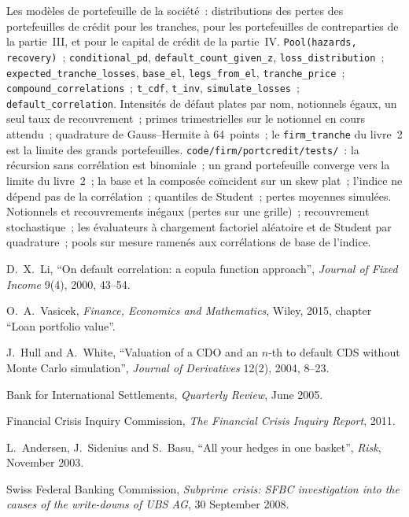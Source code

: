 \begin{build}
 Les modèles de portefeuille de la société~: distributions des pertes des portefeuilles de crédit
pour les tranches, pour les portefeuilles de contreparties de la partie~III, et pour le capital de crédit
de la partie~IV.
 \texttt{Pool(hazards, recovery)}~; \texttt{conditional\_pd},
\texttt{default\_count\_given\_z}, \texttt{loss\_distribution}~; \texttt{expected\_tranche\_losses},
\texttt{base\_el}, \texttt{legs\_from\_el}, \texttt{tranche\_price}~;
\texttt{compound\_correlations}~; \texttt{t\_cdf}, \texttt{t\_inv}, \texttt{simulate\_losses}~;
\texttt{default\_correlation}.
 Intensités de défaut plates par nom, notionnels égaux, un seul taux de recouvrement~; primes
trimestrielles sur le notionnel en cours attendu~; quadrature de Gauss--Hermite à 64~points~; le
\texttt{firm\_tranche} du livre~2 est la limite des grands portefeuilles.
 \texttt{code/firm/portcredit/tests/}~: la récursion sans
corrélation est binomiale~; un grand portefeuille converge vers la limite du livre~2~; la base et la composée
coïncident sur un skew plat~; l'indice ne dépend pas de la corrélation~; quantiles de Student~; pertes moyennes simulées.
 Notionnels et recouvrements inégaux (pertes sur une grille)~; recouvrement
stochastique~; les évaluateurs à chargement factoriel aléatoire et de Student par quadrature~; pools
sur mesure ramenés aux corrélations de base de l'indice.
\end{build}

\begin{omsources}
\item D.\ X.\ Li, ``On default correlation: a copula function approach'', \emph{Journal of
Fixed Income} 9(4), 2000, 43--54.
\item O.\ A.\ Vasicek, \emph{Finance, Economics and Mathematics}, Wiley, 2015, chapter
``Loan portfolio value''.
\item J.\ Hull and A.\ White, ``Valuation of a CDO and an $n$-th to default CDS without
Monte Carlo simulation'', \emph{Journal of Derivatives} 12(2), 2004, 8--23.
\item Bank for International Settlements, \emph{Quarterly Review}, June 2005.
\item Financial Crisis Inquiry Commission, \emph{The Financial Crisis Inquiry Report},
2011.
\item L.\ Andersen, J.\ Sidenius and S.\ Basu, ``All your hedges in one basket'', \emph{Risk},
November 2003.
\item Swiss Federal Banking Commission, \emph{Subprime crisis: SFBC investigation into the causes of the
write-downs of UBS AG}, 30 September 2008.
\end{omsources}

